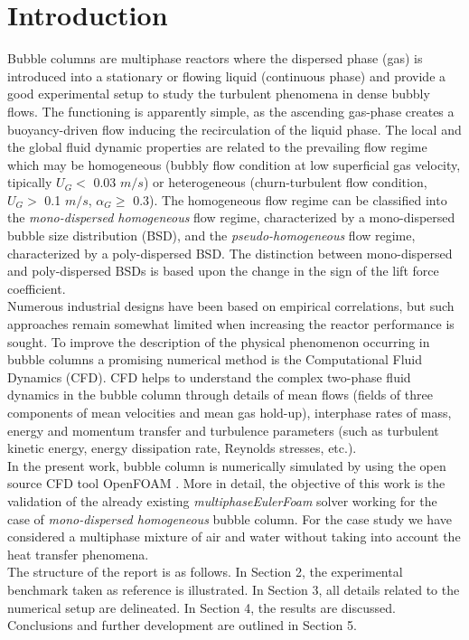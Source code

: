 \documentclass[11pt,a4paper]{article}
\begin{document}




\section{Introduction}
\label{sec:intro}
Bubble columns are multiphase reactors where the dispersed phase (gas) is introduced into a stationary or flowing liquid (continuous phase) and provide a good experimental setup to study the turbulent phenomena in dense bubbly flows. The functioning is apparently simple, as the ascending gas-phase creates a buoyancy-driven flow inducing the recirculation of the liquid phase. The local and the global fluid dynamic properties are related to the prevailing flow regime which may be homogeneous (bubbly flow condition at low superficial gas velocity, tipically $U_G<$ 0.03 $m/s$) or heterogeneous (churn-turbulent flow condition, $U_G>$ 0.1 $m/s$, $\alpha_G \geq$ 0.3). The homogeneous flow regime can be classified into the \textit{mono-dispersed homogeneous} flow regime, characterized by a mono-dispersed bubble size distribution (BSD), and the \textit{pseudo-homogeneous} flow regime, characterized by a poly-dispersed BSD. The distinction between mono-dispersed and poly-dispersed BSDs is based upon the change in the sign of the lift force coefficient. \\
Numerous industrial designs have been based on empirical correlations, but such approaches remain somewhat limited when increasing the reactor performance is sought. To improve the description of the physical phenomenon occurring in bubble columns a promising numerical method is the Computational Fluid Dynamics (CFD). CFD helps to understand the complex two-phase fluid dynamics in the bubble column through details of mean flows (fields of three components of mean velocities and mean gas hold-up), interphase rates of mass, energy and momentum transfer and turbulence parameters (such as turbulent kinetic energy, energy dissipation rate, Reynolds stresses, etc.). \\
In the present work, bubble column is numerically simulated by using the open source CFD tool OpenFOAM \cite{OF}. More in detail, the objective of this work is the validation of the already existing \textit{multiphaseEulerFoam} solver working for the case of \textit{mono-dispersed homogeneous} bubble column. For the case study we have considered a multiphase mixture of air and water without taking into account the heat transfer phenomena. \\
The structure of the report is as follows. In Section 2, the experimental benchmark taken as reference is illustrated. In Section 3, all details related to the numerical setup are delineated. In Section 4, the results are discussed. Conclusions and further development are outlined in Section 5.
\end{document}
